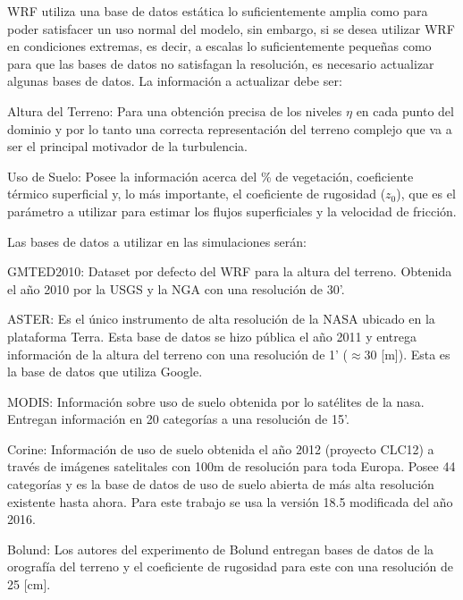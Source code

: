 WRF utiliza una base de datos estática lo suficientemente amplia como para poder satisfacer un uso normal del modelo, sin embargo, si se desea utilizar WRF en condiciones extremas, es decir, a escalas lo suficientemente pequeñas como para que las bases de datos no satisfagan la resolución, es necesario actualizar algunas bases de datos. La información a actualizar debe ser:
\begin{itemize*}
	\item Altura del Terreno: Para una obtención precisa de los niveles $\eta$ en cada punto del dominio y por lo tanto una correcta representación del terreno complejo que va a ser el principal motivador de la turbulencia.
	\item Uso de Suelo: Posee la información acerca del \% de vegetación, coeficiente térmico superficial y, lo más importante, el coeficiente de rugosidad ($z_0$), que es el parámetro a utilizar para estimar los flujos superficiales y la velocidad de fricción.
\end{itemize*}
Las bases de datos a utilizar en las simulaciones serán:
\begin{itemize*}
	\item GMTED2010: Dataset por defecto del WRF para la altura del terreno. Obtenida el año 2010 por la USGS y la NGA con una resolución de 30'.
	\item ASTER: Es el único instrumento de alta resolución de la NASA ubicado en la plataforma Terra. Esta base de datos se hizo pública el año 2011 y entrega información de la altura del terreno con una resolución de 1' ($\approx 30$ [m]). Esta es la base de datos que utiliza Google.
	\item MODIS: Información sobre uso de suelo obtenida por lo satélites de la nasa. Entregan información en 20 categorías a una resolución de 15'.
	\item Corine: Información de uso de suelo obtenida el año 2012 (proyecto CLC12) a través de imágenes satelitales con 100m de resolución para toda Europa. Posee 44 categorías y es la base de datos de uso de suelo abierta de más alta resolución existente hasta ahora. Para este trabajo se usa la versión 18.5 modificada del año 2016.
	\item Bolund: Los autores del experimento de Bolund entregan bases de datos de la orografía del terreno y el coeficiente de rugosidad para este con una resolución de 25 [cm].
\end{itemize*}
